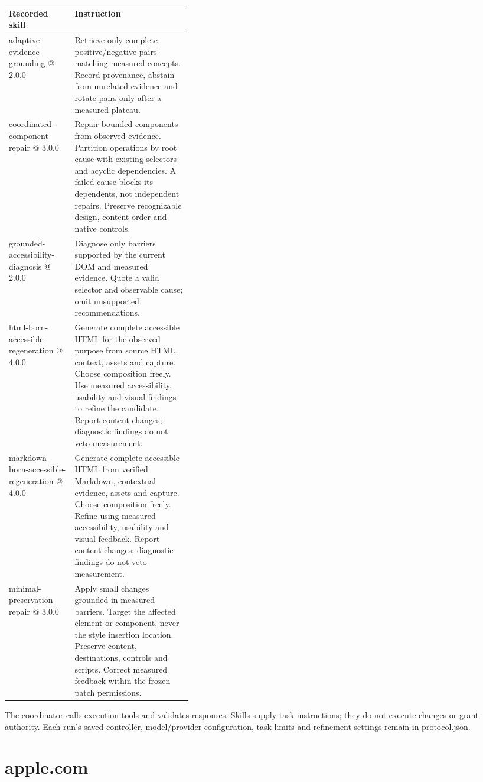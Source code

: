 \documentclass[acmsmall,screen,nonacm]{acmart}
\begin{document}
\noindent\begin{tabular*}{\linewidth}{@{\extracolsep{\fill}}p{0.3600\linewidth}p{}@{}}\toprule
\raggedright\textbf{Recorded skill} & \raggedright\textbf{Instruction}\tabularnewline\midrule
\raggedright adaptive-evidence-grounding @ 2.0.0 & \raggedright Retrieve only complete positive/negative pairs matching measured concepts. Record provenance, abstain from unrelated evidence and rotate pairs only after a measured plateau.\tabularnewline
\raggedright coordinated-component-repair @ 3.0.0 & \raggedright Repair bounded components from observed evidence. Partition operations by root cause with existing selectors and acyclic dependencies. A failed cause blocks its dependents, not independent repairs. Preserve recognizable design, content order and native controls.\tabularnewline
\raggedright grounded-accessibility-diagnosis @ 2.0.0 & \raggedright Diagnose only barriers supported by the current DOM and measured evidence. Quote a valid selector and observable cause; omit unsupported recommendations.\tabularnewline
\raggedright html-born-accessible-regeneration @ 4.0.0 & \raggedright Generate complete accessible HTML for the observed purpose from source HTML, context, assets and capture. Choose composition freely. Use measured accessibility, usability and visual findings to refine the candidate. Report content changes; diagnostic findings do not veto measurement.\tabularnewline
\raggedright markdown-born-accessible-regeneration @ 4.0.0 & \raggedright Generate complete accessible HTML from verified Markdown, contextual evidence, assets and capture. Choose composition freely. Refine using measured accessibility, usability and visual feedback. Report content changes; diagnostic findings do not veto measurement.\tabularnewline
\raggedright minimal-preservation-repair @ 3.0.0 & \raggedright Apply small changes grounded in measured barriers. Target the affected element or component, never the style insertion location. Preserve content, destinations, controls and scripts. Correct measured feedback within the frozen patch permissions.\tabularnewline
\bottomrule\end{tabular*}\endgroup\par\medskip
The coordinator calls execution tools and validates responses. Skills supply task instructions; they do not execute changes or grant authority. Each run's saved controller, model/provider configuration, task limits and refinement settings remain in protocol.json.

\clearpage
\section{apple.com}
\end{document}
